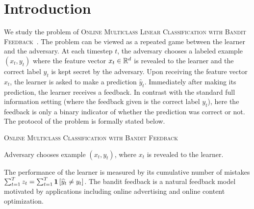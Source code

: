 \section{Introduction}
\label{section:introduction}

We study the problem of \textsc{Online Multiclass Linear Classification with
Bandit Feedback}~\citep{Kakade-Shalev-Shwartz-Tewari-2008}. The problem can be
viewed as a repeated game between the learner and the adversary. At each
timestep $t$, the adversary chooses a labeled example $(x_t, y_t)$ where the
feature vector $x_t \in \mathbb{R}^d$ is revealed to the learner and the correct label
$y_t$ is kept secret by the adversary. Upon receiving the feature vector $x_t$,
the learner is asked to make a prediction $\widehat{y}_t$. Immediately after
making its prediction, the learner receives a feedback. In contrast with the
standard full information setting (where the feedback given is the correct label
$y_t$), here the feedback is only a binary indicator of whether the prediction
was correct or not. The protocol of the problem is formally stated below.

\begin{protocol}[h]
\caption{\textsc{Online Multiclass Classification with Bandit Feedback}
\label{algorithm:game-protocol}}
\begin{algorithmic}[1]
{
\STATE Adversary chooses example $(x_t, y_t)$, where $x_t$ is revealed to the learner.
\ENDFOR
}
\end{algorithmic}
\end{protocol}

The performance of the learner is measured by its cumulative number of
mistakes $\sum_{t=1}^T z_t = \sum_{t=1}^T \mathbf{1}\left[\widehat y_t \neq y_t \right]$.
The bandit feedback is a natural feedback model motivated by applications
including online advertising and online content optimization.

